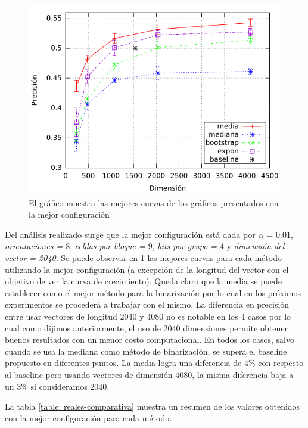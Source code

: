 			\begin{figure}[htbp]
				\centering
				\centerline{
					\includegraphics[scale=0.6]{img/resultados/reales/comparativa_metodos.png}
				}
				\caption[Reales comparativa]{El gráfico muestra las mejores curvas de los gráficos presentados con la mejor configuración}
				\label{fig: Reales-Comparativa metodos}
			\end{figure}

	Del análisis realizado surge que la mejor configuración está dada por \textit{$\alpha$ = $0.01$}, \textit{orientaciones = $8$}, \textit{celdas por bloque = $9$}, \textit{bits por grupo = $4$} y \textit{dimensión del vector = 2040}. Se puede observar en \ref{fig: Reales-Comparativa metodos} las mejores curvas para cada método utilizando la mejor configuración (a excepción de la longitud del vector con el objetivo de ver la curva de crecimiento). Queda claro que la media se puede establecer como el mejor método para la binarización por lo cual en los próximos experimentos se procederá a trabajar con el mismo. La diferencia en precisión entre usar vectores de longitud $2040$ y $4080$ no es notable en los $4$ casos por lo cual como dijimos anteriormente, el uso de $2040$ dimensiones permite obtener buenos resultados con un menor costo computacional. En todos los casos, salvo cuando se usa la mediana como método de binarización, se supera el baseline propuesto en diferentes puntos. La media logra una diferencia de $4\%$ con respecto al baseline pero usando vectores de dimensión $4080$, la misma diferencia baja a un $3\%$ si consideramos $2040$.

	La tabla \ref{table: reales-comparativa} muestra un resumen de los valores obtenidos con la mejor configuración para cada método.

